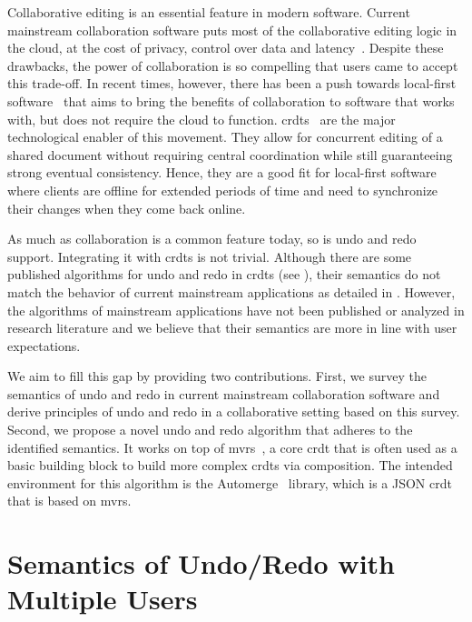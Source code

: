 \documentclass[sigplan,natbib=false,review]{acmart}
\begin{document}
Collaborative editing is an essential feature in modern software.
Current mainstream collaboration software puts most of the collaborative
editing logic in the cloud, at the cost of privacy, control over data
and latency~\cite{kleppmann2019local}.
Despite these drawbacks, the power of collaboration is so compelling that
users came to accept this trade-off.
In recent times, however, there has been a push towards local-first
software~\cite{kleppmann2019local} that aims to bring the benefits of
collaboration to software that works with, but does not require the cloud
to function.
\glspl*{crdt}~\cite{preguicca2018conflict}
are the major technological enabler of this movement.
They allow for concurrent editing of a shared document without requiring
central coordination while still guaranteeing strong eventual consistency.
Hence, they are a good fit for local-first software where clients
are offline for extended periods of time and need to synchronize their
changes when they come back online.

As much as collaboration is a common feature today, so is undo and redo support.
Integrating it with \glspl*{crdt} is not trivial.
Although there are some published algorithms for undo and redo in \glspl*{crdt}
(see ),
their semantics do not match the behavior of current mainstream applications
as detailed in .
However, the algorithms of mainstream applications have not been published
or analyzed in research literature and we
believe that their semantics are more in line with user expectations.

We aim to fill this gap by providing two contributions.
First, we survey the semantics of undo and redo in current mainstream
collaboration software and derive principles of undo and redo in a collaborative
setting based on this survey.
Second, we propose a novel undo and redo algorithm that adheres to the
identified semantics.
It works on top of \glspl*{mvr}~\cite{shapiro2011comprehensive},
a core \gls*{crdt} that is often used as a basic
building block to build more complex \glspl*{crdt} via composition.
The intended environment for this algorithm is the Automerge~\cite{automerge} library,
which is a JSON \gls*{crdt} that is based on \glspl*{mvr}.

\section{Semantics of Undo/Redo with Multiple Users}\label{sec:semantics}
\end{document}
